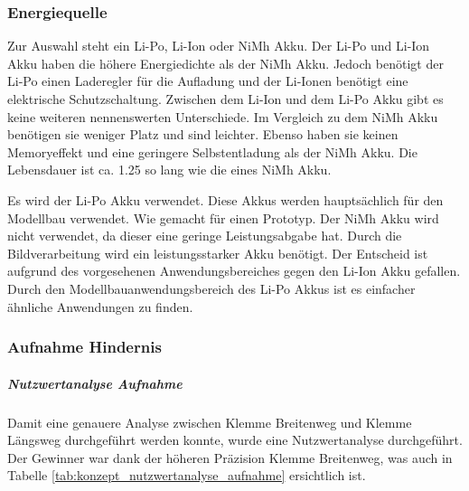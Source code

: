 \documentclass[../main.tex]{subfiles}
\begin{document}
\subsubsection{Energiequelle}
Zur Auswahl steht ein Li-Po, Li-Ion oder NiMh Akku. Der Li-Po und Li-Ion Akku haben die höhere Energiedichte als der NiMh Akku. Jedoch benötigt der Li-Po einen Laderegler für die Aufladung und der Li-Ionen benötigt eine elektrische Schutzschaltung. Zwischen dem Li-Ion und dem Li-Po Akku gibt es keine weiteren nennenswerten Unterschiede. 
Im Vergleich zu dem NiMh Akku benötigen sie weniger Platz und sind leichter. Ebenso haben sie keinen Memoryeffekt und eine geringere Selbstentladung als der NiMh Akku. Die Lebensdauer ist ca. 1.25 so lang wie die eines NiMh Akku.

Es wird der Li-Po Akku verwendet. Diese Akkus werden hauptsächlich für den Modellbau verwendet. Wie gemacht für einen Prototyp. Der NiMh Akku wird nicht verwendet, da dieser eine geringe Leistungsabgabe hat. Durch die Bildverarbeitung wird ein leistungsstarker Akku benötigt. Der Entscheid ist aufgrund des vorgesehenen Anwendungsbereiches gegen den Li-Ion Akku gefallen. Durch den Modellbauanwendungsbereich des Li-Po Akkus ist es einfacher ähnliche Anwendungen zu finden.


\newpage
\subsubsection{Aufnahme Hindernis}
\subparagraph{Nutzwertanalyse Aufnahme}
        Damit eine genauere Analyse zwischen Klemme Breitenweg und Klemme Längsweg durchgeführt werden konnte, wurde eine Nutzwertanalyse durchgeführt. Der Gewinner war dank der höheren Präzision Klemme Breitenweg, was auch in Tabelle \ref{tab:konzept_nutzwertanalyse_aufnahme} ersichtlich ist.
        
\end{document}
